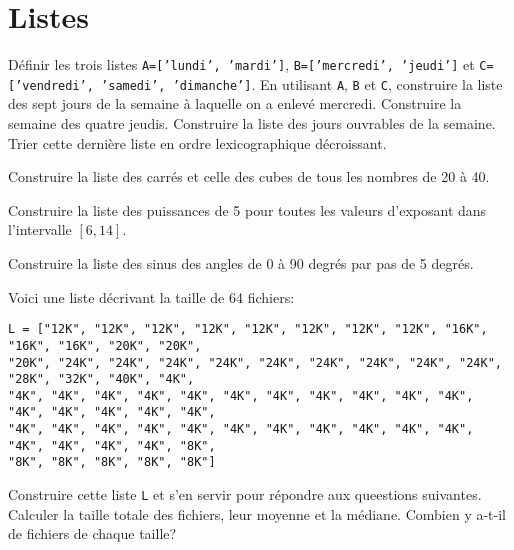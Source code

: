 

\section{Listes}

\begin{exercice}
Définir les trois listes
\texttt{A=['lundi', 'mardi']},
\texttt{B=['mercredi', 'jeudi']} et
\texttt{C=['vendredi', 'samedi', 'dimanche']}.
En utilisant \texttt{A}, \texttt{B} et \texttt{C},
construire la liste des sept jours de la semaine à laquelle on a enlevé mercredi.
Construire la semaine des quatre jeudis.
Construire la liste des jours ouvrables de la semaine. 
Trier cette dernière liste en ordre lexicographique décroissant.
\end{exercice}

\begin{exercice}
Construire la liste des carrés et celle des cubes de tous les nombres de 20 à 40.
\end{exercice}

\begin{exercice}
Construire la liste des puissances de 5 pour toutes les valeurs d'exposant
dans l'intervalle $[6,14]$.
\end{exercice}

\begin{exercice}
Construire la liste des sinus des angles de 0 à 90 degrés par pas de 5 degrés.
\end{exercice}

\begin{exercice}
Voici une liste décrivant la taille de 64 fichiers:
{\footnotesize
\begin{verbatim}
L = ["12K", "12K", "12K", "12K", "12K", "12K", "12K", "12K", "16K", "16K", "16K", "20K", "20K", 
"20K", "24K", "24K", "24K", "24K", "24K", "24K", "24K", "24K", "24K", "28K", "32K", "40K", "4K", 
"4K", "4K", "4K", "4K", "4K", "4K", "4K", "4K", "4K", "4K", "4K", "4K", "4K", "4K", "4K", "4K", 
"4K", "4K", "4K", "4K", "4K", "4K", "4K", "4K", "4K", "4K", "4K", "4K", "4K", "4K", "4K", "8K", 
"8K", "8K", "8K", "8K", "8K"] 
\end{verbatim}
}
Construire cette liste \texttt{L} et s'en servir pour répondre aux queestions
suivantes. Calculer la taille totale des fichiers,
leur moyenne et la médiane.
Combien y a-t-il de fichiers de chaque taille?
\end{exercice}


